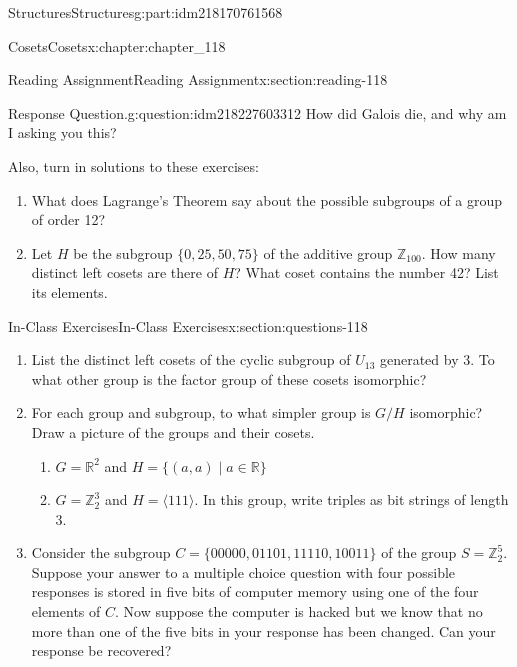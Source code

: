 \documentclass[oneside,10pt,]{book}
\numberwithin{equation}{section}
\begin{document}
\begin{partptx}{Structures}{}{Structures}{}{}{g:part:idm218170761568}
\begin{chapterptx}{Cosets}{}{Cosets}{}{}{x:chapter:chapter_118}
\begin{sectionptx}{Reading Assignment}{}{Reading Assignment}{}{}{x:section:reading-118}
\begin{question}{Response Question.}{g:question:idm218227603312}%
How did Galois die, and why am I asking you this?%
\end{question}
Also, turn in solutions to these exercises:%
\begin{enumerate}[label=\arabic*.]
\item{}What does Lagrange's Theorem say about the possible subgroups of a group of order 12?%
\item{}Let \(H\) be the subgroup \(\{0,25,50,75\}\) of the additive group \(\mathbb{Z}_{100}\). How many distinct left cosets are there of \(H\)?  What coset contains the number 42? List its elements.%
\end{enumerate}
%
\end{sectionptx}
%
%
\typeout{************************************************}
\typeout{************************************************}
%
\begin{sectionptx}{In-Class Exercises}{}{In-Class Exercises}{}{}{x:section:questions-118}
%
\begin{enumerate}[label=\arabic*.]
\item{}List the distinct left cosets of the cyclic subgroup of \(U_{13}\) generated by 3. To what other group is the factor group of these cosets isomorphic?%
\item{}For each group and subgroup, to what simpler group is  \(G/H\) isomorphic?  Draw a picture of the groups and their cosets.%
\begin{enumerate}[label=(\alph*)]
\item{}\(G= \mathbb{R}^2\)  and  \(H = \{(a,a) \mid a\in\mathbb{R}\}\)%
\item{}\(G = \mathbb{Z}_2^3\)  and  \(H = \langle 111 \rangle\).  In this group, write triples as bit strings of length 3.%
\end{enumerate}
%
\item{}Consider the subgroup \(C = \{00000, 01101, 11110, 10011\}\) of the group \(S=\mathbb{Z}_2^5\). Suppose your answer to a multiple choice question with four possible responses is stored in five bits of computer memory using one of the four elements of  \(C\).  Now suppose the computer is hacked but we know that no more than one of the five bits in your response has been changed.  Can your response be recovered?%
\end{enumerate}
%
\end{sectionptx}
\end{chapterptx}

\end{partptx}
\end{document}
